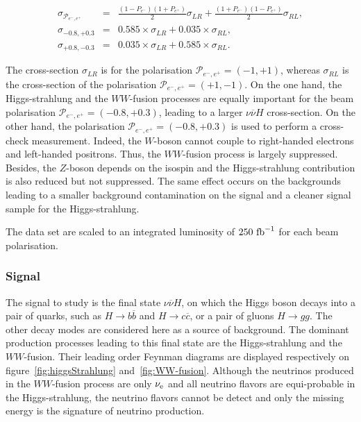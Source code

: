      \begin{equation}
       \begin{array}{lrc}
       \sigma_{\mathcal{P}_{e^-,e^+}} & = & \frac{(1 - P_{e^-})(1+P_{e^+})}{2} \sigma_{LR} + \frac{(1+P_{e^-})(1-P_{e^+})}{2} \sigma_{RL}, \\
       \sigma_{-0.8,+0.3} & = & 0.585 \times \sigma_{LR} + 0.035 \times \sigma_{RL}, \\
       \sigma_{+0.8,-0.3} & = & 0.035 \times \sigma_{LR} + 0.585 \times \sigma_{RL}.
       \end{array}
     \end{equation}

     The cross-section $\sigma_{LR}$ is for the polarisation $\mathcal{P}_{e^-,e^+} = (-1,+1)$, whereas $\sigma_{RL}$ is the cross-section of the polarisation $\mathcal{P}_{e^-,e^+} = (+1,-1)$.
     On the one hand, the Higgs-strahlung and the $WW$-fusion processes are equally important for the beam polarisation  $\mathcal{P}_{e^-,e^+} = (-0.8,+0.3)$, leading to a larger $\nu\overline{\nu} H$ cross-section.
     On the other hand, the polarisation $\mathcal{P}_{e^-,e^+} = (-0.8,+0.3)$ is used to perform a cross-check measurement.
     Indeed, the $W$-boson cannot couple to right-handed electrons and left-handed positrons.
     Thus, the $WW$-fusion process is largely suppressed.
     Besides, the $Z$-boson depends on the isospin and the Higgs-strahlung contribution is also reduced but not suppressed.
     The same effect occurs on the backgrounds leading to a smaller background contamination on the signal and a cleaner signal sample for the Higgs-strahlung.

     The data set are scaled to an integrated luminosity of $250~\rm{fb}^{-1}$ for each beam polarisation.

  \subsubsection{Signal}

    The signal to study is the final state $\nu\overline{\nu}H$, on which the Higgs boson decays into a pair of quarks, such as $H \rightarrow b\overline{b}$ and $H \rightarrow c\overline{c}$, or a pair of gluons $H \rightarrow gg$. 
    The other decay modes are considered here as a source of background. 
    The dominant production processes leading to this final state are the Higgs-strahlung and the $WW$-fusion.
    Their leading order Feynman diagrams are displayed respectively on figure~\ref{fig:higgsStrahlung} and~\ref{fig:WW-fusion}.
    Although the neutrinos produced in the $WW$-fusion process are only $\nu_{\rm{e}}$ and all neutrino flavors are equi-probable in the Higgs-strahlung, the neutrino flavors cannot be detect and only the missing energy is the signature of neutrino production.

